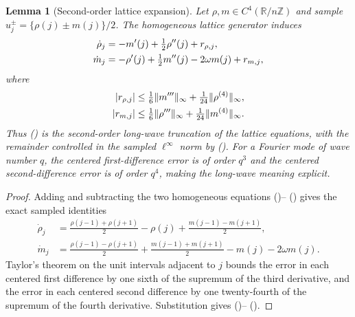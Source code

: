\documentclass[twoside,10pt]{article}
\numberwithin{equation}{section}
\theoremstyle{slbody}
\newtheorem{lemma}[theorem]{Lemma}
\theoremstyle{definition}
\theoremstyle{remark}
\newcommand{\Z}{\mathbb Z}
\renewcommand{\eqref}[1]{%
  \textup{{\normalfont(\oldstylenums{\ref{#1}}}\normalfont)}}
\begin{document}
\begin{lemma}[Second-order lattice expansion]
\label{lem:telegraph-taylor}
Let $\rho,m\in C^4(\mathbb R/n\Z)$ and sample
$u_j^\pm=\{\rho(j)\pm m(j)\}/2$.  The homogeneous lattice generator
induces
\begin{align}
 \dot\rho_j&=-m'(j)+\tfrac12\rho''(j)+r_{\rho,j},\notag\\
 \dot m_j&=-\rho'(j)+\tfrac12m''(j)-2\omega m(j)+r_{m,j},
 \label{eq:lattice-taylor-system}
\end{align}
where
\begin{align}
 |r_{\rho,j}|&\le\tfrac16\|m'''\|_\infty
                    +\tfrac1{24}\|\rho^{(4)}\|_\infty,\notag\\
 |r_{m,j}|&\le\tfrac16\|\rho'''\|_\infty
                    +\tfrac1{24}\|m^{(4)}\|_\infty.
 \label{eq:lattice-taylor-remainder}
\end{align}
Thus \eqref{eq:corrected-telegraph-system} is the second-order
long-wave truncation of the lattice equations, with the remainder
controlled in the sampled $\ell^\infty$ norm by
\eqref{eq:lattice-taylor-remainder}.  For a Fourier mode of wave number
$q$, the centered first-difference error is of order $q^3$ and the
centered second-difference error is of order $q^4$, making the long-wave
meaning explicit.
\end{lemma}

\begin{proof}
Adding and subtracting the two homogeneous equations
\eqref{eq:generator-plus}--\eqref{eq:generator-minus} gives the exact
sampled identities
\begin{align*}
 \dot\rho_j
 &=\frac{\rho(j-1)+\rho(j+1)}2-\rho(j)
   +\frac{m(j-1)-m(j+1)}2,\\
 \dot m_j
 &=\frac{\rho(j-1)-\rho(j+1)}2
   +\frac{m(j-1)+m(j+1)}2-m(j)-2\omega m(j).
\end{align*}
Taylor's theorem on the unit intervals adjacent to $j$ bounds the
error in each centered first difference by one sixth of the supremum
of the third derivative, and the error in each centered second
difference by one twenty-fourth of the supremum of the fourth
derivative.  Substitution gives
\eqref{eq:lattice-taylor-system}--\eqref{eq:lattice-taylor-remainder}.
\end{proof}
\end{document}
